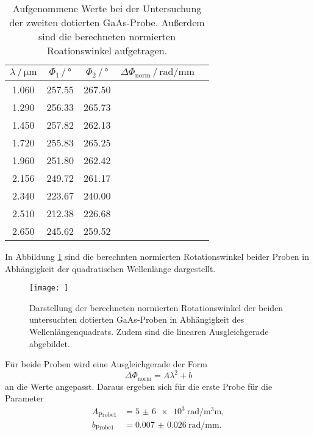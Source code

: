    \begin{table}[H]
    \centering
    \caption{Aufgenommene Werte bei der Untersuchung der zweiten dotierten GaAs-Probe. Außerdem sind die 
    berechneten normierten Roationswinkel aufgetragen.}
    \label{tab:tab:Probe2}
    \begin{tabular}{ccccc}
      \toprule
      $\lambda\, / \, \si{\micro\meter}$ & $\Phi_1 \, / \, \si{\degree}$ & $\Phi_2 \, / \, \si{\degree}$ & $\Delta\Phi_\text{norm} \, / \, \si{\radian\per\milli\meter}$  \\
      \midrule
      1.060 & 257.55 & 267.50 &  \\
      1.290 & 256.33 & 265.73 &  \\
      1.450 & 257.82 & 262.13 &  \\
      1.720 & 255.83 & 265.25 &  \\
      1.960 & 251.80 & 262.42 &  \\
      2.156 & 249.72 & 261.17 &  \\
      2.340 & 223.67 & 240.00 &  \\
      2.510 & 212.38 & 226.68 &  \\
      2.650 & 245.62 & 259.52 &  \\
      \bottomrule
    \end{tabular}
   \end{table} \noindent
   In Abbildung \ref{fig:beideProben} sind die berechnten normierten Rotationswinkel beider Proben in
   Abhängigkeit der quadratischen Wellenlänge dargestellt.
   \begin{figure}[H]
       \centering
       \texttt{[image: ]}
       \caption{Darstellung der berechneten normierten Rotationswinkel der beiden untersuchten 
       dotierten GaAs-Proben in Abhängigkeit des Wellenlängenquadrats. Zudem sind die linearen
       Ausgleichgerade abgebildet.}
       \label{fig:beideProben}
   \end{figure} \noindent
   Für beide Proben wird eine Ausgleichgerade der 
   Form 
   \begin{equation}
       \Delta \Phi_\text{norm} = A \lambda^2 + b
   \end{equation} \noindent
   an die Werte angepasst. Daraus ergeben sich für die erste Probe für die Parameter
   \begin{align}
       A_\text{Probe1} &= \SI{5(6)e3}{\radian\per\cubic\milli\meter}, \\
        b_\text{Probe1} &= \SI{0.007(26)}{\radian\per\milli\meter}.
   \end{align} \noindent
